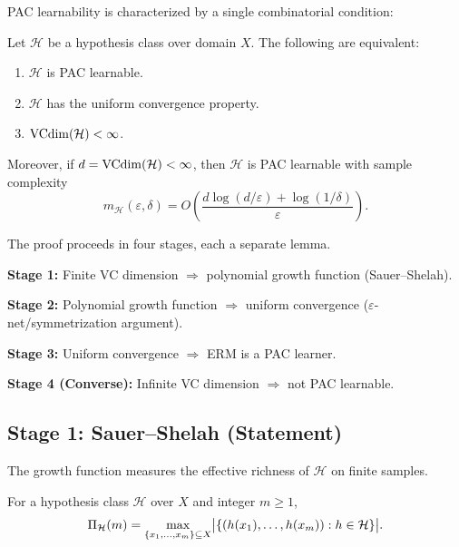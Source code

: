 PAC learnability is characterized by a single combinatorial condition:

\begin{thm}
\label{thm:vc-char-pac}
Let $\mathcal{H}$ be a hypothesis class over domain $X$.  The following are
equivalent:
\begin{enumerate}[label=(\roman*)]
\item $\mathcal{H}$ is PAC learnable.
\item $\mathcal{H}$ has the uniform convergence property.
\item $\mathrm{VCdim}(\mathcal{H}) < \infty$.
\end{enumerate}
Moreover, if $d = \mathrm{VCdim}(\mathcal{H}) < \infty$, then $\mathcal{H}$ is PAC
learnable with sample complexity
\[
  m_\mathcal{H}(\varepsilon, \delta)
  = O\!\left(\frac{d \log(d/\varepsilon) + \log(1/\delta)}{\varepsilon}\right).
\]
\end{thm}

The proof proceeds in four stages, each a separate lemma.

\bigskip
\noindent\textbf{Stage 1:} Finite VC dimension $\Longrightarrow$ polynomial
growth function (Sauer--Shelah).

\noindent\textbf{Stage 2:} Polynomial growth function $\Longrightarrow$
uniform convergence ($\varepsilon$-net/symmetrization argument).

\noindent\textbf{Stage 3:} Uniform convergence $\Longrightarrow$ ERM is a
PAC learner.

\noindent\textbf{Stage 4 (Converse):} Infinite VC dimension
$\Longrightarrow$ not PAC learnable.



\subsection{Stage 1: Sauer--Shelah (Statement)}
\label{sec:sauer-shelah}

The growth function measures the effective richness of $\mathcal{H}$ on finite
samples.

\begin{defn}
\label{def:growth-function-pac}
For a hypothesis class $\mathcal{H}$ over $X$ and integer $m \geq 1$,
\[
  \Pi_\mathcal{H}(m) = \max_{\{x_1, \ldots, x_m\} \subseteq X}
  \bigl|\{(h(x_1), \ldots, h(x_m)) : h \in \mathcal{H}\}\bigr|.
\]
\end{defn}

